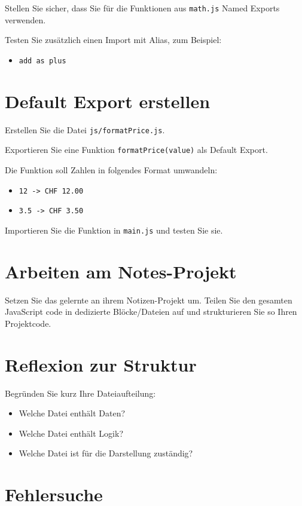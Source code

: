\documentclass[a4paper,12pt]{article}
\begin{document}
Stellen Sie sicher, dass Sie für die Funktionen aus \texttt{math.js} Named Exports verwenden.

Testen Sie zusätzlich einen Import mit Alias, zum Beispiel:
\begin{itemize}
    \item \texttt{add as plus}
\end{itemize}

\section{Default Export erstellen}

Erstellen Sie die Datei \texttt{js/formatPrice.js}.

Exportieren Sie eine Funktion \texttt{formatPrice(value)} als Default Export.

Die Funktion soll Zahlen in folgendes Format umwandeln:
\begin{itemize}
    \item \texttt{12 -> CHF 12.00}
    \item \texttt{3.5 -> CHF 3.50}
\end{itemize}

Importieren Sie die Funktion in \texttt{main.js} und testen Sie sie.

\section{Arbeiten am Notes-Projekt}

Setzen Sie das gelernte an ihrem Notizen-Projekt um. Teilen Sie den gesamten JavaScript code in dedizierte Blöcke/Dateien auf und strukturieren Sie so Ihren Projektcode.

\section{Reflexion zur Struktur}

Begründen Sie kurz Ihre Dateiaufteilung:
\begin{itemize}
    \item Welche Datei enthält Daten?
    \item Welche Datei enthält Logik?
    \item Welche Datei ist für die Darstellung zuständig?
\end{itemize}

\section{Fehlersuche}
\end{document}
